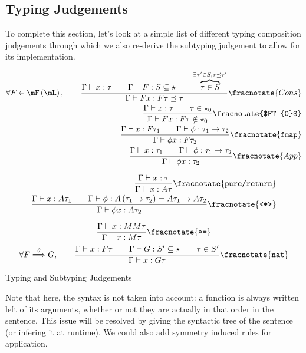 \documentclass[math, english, info]{cours}
\def\cont{\Gamma\vdash}
\def\poulpe{\qquad}
\begin{document}
\subsection{Typing Judgements}
To complete this section, let's look at a simple list of different typing composition judgements through which we also re-derive the subtyping judgement to allow for its implementation.
\begin{table}
\begin{align*}
	\forall F \in \mF\left( \mL \right),\poulpe
	\frac{\cont x: \tau \poulpe \cont F: S\subseteq \star \poulpe \overbrace{\tau \in S}^{\exists \tau'\in S, \tau \preceq \tau'}}{\cont Fx: F\tau \preceq \tau}\fracnotate{Cons}\\
	\frac{\cont x: \tau \poulpe \tau \in \star_{0}}{\cont Fx: F\tau \notin \star_{0}}\fracnotate{$FT_{0}$}\\
	\frac{\cont x: F\tau_{1} \poulpe \cont \phi: \tau_{1} \to \tau_{2}}{\cont \phi x: F\tau_{2} }\fracnotate{\texttt{fmap}}\\
	\frac{\cont x: \tau_{1} \poulpe \cont \phi: \tau_{1} \to \tau_{2}}{\cont \phi x: \tau_{2}}\fracnotate{App}
\end{align*}

\begin{align*}
	\frac{\cont x: \tau}{\cont x: A\tau}\fracnotate{\texttt{pure/return}}\\
	\frac{\cont x: A\tau_{1} \poulpe \cont \phi: A\left( \tau_{1} \to \tau_{2} \right) = A\tau_{1} \to A\tau_{2}}{\cont \phi x: A\tau_{2}}\fracnotate{\texttt{<*>}}
\end{align*}

\begin{align*}
	\frac{\cont x: MM\tau}{\cont x: M\tau}\fracnotate{\texttt{>>=}}
\end{align*}
\begin{align*}
	\forall F \overset{\theta}{\Longrightarrow} G,\poulpe \frac{\cont x: F\tau \poulpe \cont G: S' \subseteq \star \poulpe \tau \in S'}{\cont x : G\tau}\fracnotate{\texttt{nat}}
\end{align*}

\caption{Typing and Subtyping Judgements}
\end{table}
Note that here, the syntax is not taken into account: a function is always written left of its arguments, whether or not they are actually in that order in the sentence.
This issue will be resolved by giving the syntactic tree of the sentence (or infering it at runtime).
We could also add symmetry induced rules for application.
\end{document}
